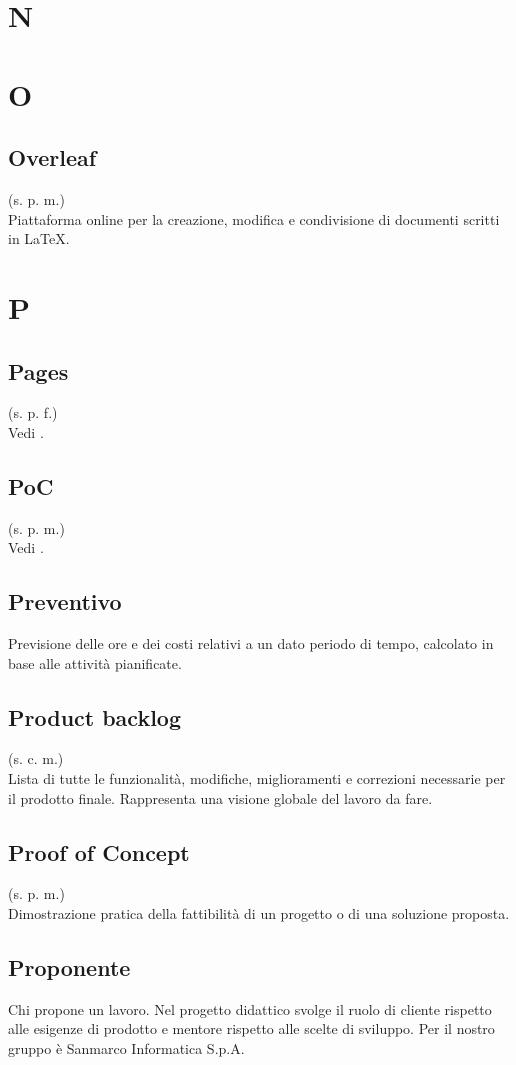 \section{N}
\pagebreak
\section{O}
    \subsection{Overleaf}
    (s. p. m.)\\
    Piattaforma online per la creazione, modifica e condivisione di documenti 
    scritti in LaTeX.
\pagebreak
\section{P}
    \subsection{Pages}
    (s. p. f.)\\
    Vedi .
    \subsection{PoC}
    (s. p. m.)\\
    Vedi .
    \subsection{Preventivo}
    Previsione delle ore e dei costi relativi a un dato periodo di tempo,
    calcolato in base alle attività pianificate.
    \subsection{Product backlog}
    \label{Product backlog}
    (s. c. m.)\\
    Lista di tutte le funzionalità, modifiche, miglioramenti e correzioni necessarie 
    per il prodotto finale. Rappresenta una visione globale del lavoro da fare.
    \subsection{Proof of Concept}
    \label{Proof of Concept}
    (s. p. m.)\\
    Dimostrazione pratica della fattibilità di un progetto o di una soluzione proposta.
    \subsection{Proponente}
    Chi propone un lavoro. Nel progetto didattico svolge il ruolo di cliente 
    rispetto alle esigenze di prodotto e mentore rispetto alle scelte di sviluppo.
    Per il nostro gruppo è Sanmarco Informatica S.p.A.
